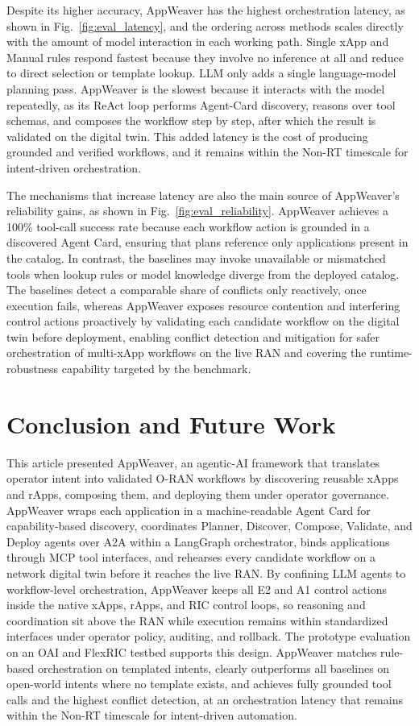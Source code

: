 \documentclass[conference]{IEEEtran}
\begin{document}
Despite its higher accuracy, AppWeaver has the highest orchestration latency, as shown in Fig.~\ref{fig:eval_latency}, and the ordering across methods scales directly with the amount of model interaction in each working path. Single xApp and Manual rules respond fastest because they involve no inference at all and reduce to direct selection or template lookup. LLM only adds a single language-model planning pass. AppWeaver is the slowest because it interacts with the model repeatedly, as its ReAct loop performs Agent-Card discovery, reasons over tool schemas, and composes the workflow step by step, after which the result is validated on the digital twin. This added latency is the cost of producing grounded and verified workflows, and it remains within the Non-RT timescale for intent-driven orchestration.

The mechanisms that increase latency are also the main source of AppWeaver's reliability gains, as shown in Fig.~\ref{fig:eval_reliability}. AppWeaver achieves a 100\% tool-call success rate because each workflow action is grounded in a discovered Agent Card, ensuring that plans reference only applications present in the catalog. In contrast, the baselines may invoke unavailable or mismatched tools when lookup rules or model knowledge diverge from the deployed catalog. The baselines detect a comparable share of conflicts only reactively, once execution fails, whereas AppWeaver exposes resource contention and interfering control actions proactively by validating each candidate workflow on the digital twin before deployment, enabling conflict detection and mitigation for safer orchestration of multi-xApp workflows on the live RAN and covering the runtime-robustness capability targeted by the benchmark.



\section{Conclusion and Future Work}\label{sec:conclusion}
This article presented AppWeaver, an agentic-AI framework that translates operator intent into validated O-RAN workflows by discovering reusable xApps and rApps, composing them, and deploying them under operator governance. AppWeaver wraps each application in a machine-readable Agent Card for capability-based discovery, coordinates Planner, Discover, Compose, Validate, and Deploy agents over A2A within a LangGraph orchestrator, binds applications through MCP tool interfaces, and rehearses every candidate workflow on a network digital twin before it reaches the live RAN. By confining LLM agents to workflow-level orchestration, AppWeaver keeps all E2 and A1 control actions inside the native xApps, rApps, and RIC control loops, so reasoning and coordination sit above the RAN while execution remains within standardized interfaces under operator policy, auditing, and rollback. The prototype evaluation on an OAI and FlexRIC testbed supports this design. AppWeaver matches rule-based orchestration on templated intents, clearly outperforms all baselines on open-world intents where no template exists, and achieves fully grounded tool calls and the highest conflict detection, at an orchestration latency that remains within the Non-RT timescale for intent-driven automation.
\end{document}
